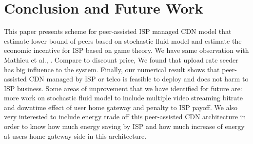 \documentclass[paper]{ieice}
\begin{document}
\section{Conclusion and Future Work}\label{conclude}
This paper presents scheme for peer-assisted ISP managed CDN model that estimate lower bound of peers based on stochastic fluid model and estimate the economic incentive for ISP based on game theory.  
We have same observation with Mathieu et al., \cite{6249305}.  
Compare to discount price, We found that upload rate seeder has big influence to the system.
Finally, our numerical result shows that peer-assisted CDN managed by ISP or telco is feasible to deploy and does not harm to ISP business. 
Some areas of improvement that we have identified for future are:
more work on stochastic fluid model to include multiple video streaming bitrate and downtime effect of user home gateway and penalty to ISP payoff. 
We also very interested to include energy trade off this peer-assisted CDN architecture in order to know how much energy saving by ISP and how much increase of energy at users home gateway side in this architecture. 








\end{document}
